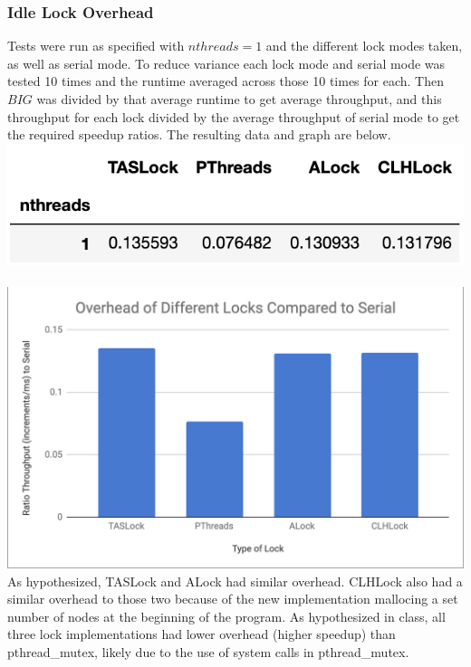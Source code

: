 \documentclass{article}
\begin{document}
\begin{adjustwidth}{-2cm}{-2cm}
\subsubsection{Idle Lock Overhead}
Tests were run as specified with $nthreads = 1$ and the different lock modes taken, as well as serial mode. To reduce variance each lock mode and serial mode was tested 10 times and the runtime averaged across those 10 times for each. Then $BIG$ was divided by that average runtime to get average throughput, and this throughput for each lock divided by the average throughput of serial mode to get the required speedup ratios. The resulting data and graph are below.\\
\includegraphics[width=\linewidth]{overheadData.png}\\
\null\\
\includegraphics[width=\linewidth]{overheadGraph.png}\\
As hypothesized, TASLock and ALock had similar overhead. CLHLock also had a similar overhead to those two because of the new implementation mallocing a set number of nodes at the beginning of the program. As hypothesized in class, all three lock implementations had lower overhead (higher speedup) than pthread\_mutex, likely due to the use of system calls in pthread\_mutex.

\end{adjustwidth}
\end{document}
